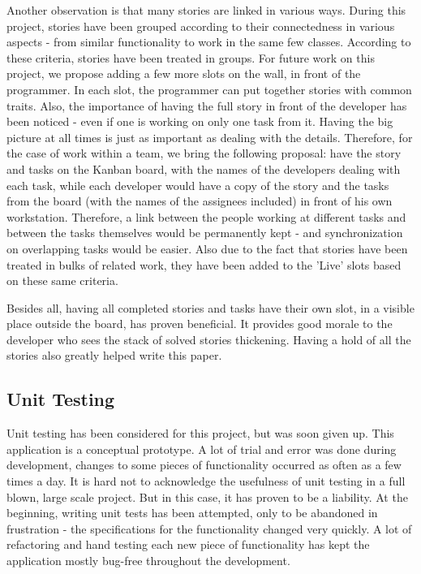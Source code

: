 Another observation is that many stories are linked in various ways.
During this project, stories have been grouped according to their connectedness
in various aspects - from similar functionality to work in the same few classes.
According to these criteria, stories have been treated in groups. For future
work on this project, we propose adding a few more slots on the wall, in front
of the programmer. In each slot, the programmer can put together stories with
common traits. Also, the importance of having the full story in front of the
developer has been noticed - even if one is working on only one task from it.
Having the big picture at all times is just as important as dealing with the
details. Therefore, for the case of work within a team, we bring the following
proposal: have the story and tasks on the Kanban board, with the names of the
developers dealing with each task, while each developer would have a copy of the
story and the tasks from the board (with the names of the assignees included) in
front of his own workstation. Therefore, a link between the people working at
different tasks and between the tasks themselves would be permanently kept - and
synchronization on overlapping tasks would be easier. Also due to the fact that
stories have been treated in bulks of related work, they have been added to the
'Live' slots based on these same criteria. \newline

Besides all, having all completed stories and tasks have their own slot, in
a visible place outside the board, has proven beneficial. It provides good
morale to the developer who sees the stack of solved stories thickening.
Having a hold of all the stories also greatly helped write this paper. \newline

\subsection{Unit Testing}

Unit testing has been considered for this project, but was soon given up. This
application is a conceptual prototype. A lot of trial and error was done during
development, changes to some pieces of functionality occurred as often as a few
times a day. It is hard not to acknowledge the usefulness of unit testing in a
full blown, large scale project. But in this case, it has proven to be a
liability. At the beginning, writing unit tests has been attempted, only to be
abandoned in frustration -  the specifications for the functionality changed
very quickly. A lot of refactoring and hand testing each new piece of
functionality has kept the application mostly bug-free throughout the
development.

